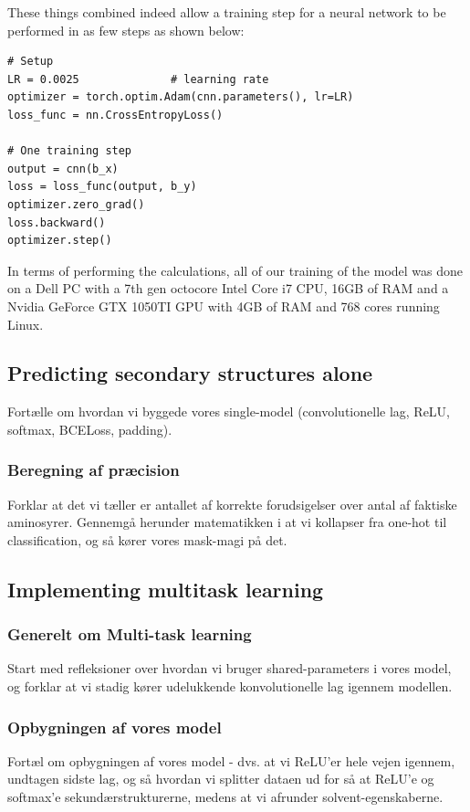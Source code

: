 These things combined indeed allow a training step for a neural network to be performed in as few steps as shown below:
\begin{lstlisting}
# Setup
LR = 0.0025              # learning rate
optimizer = torch.optim.Adam(cnn.parameters(), lr=LR)
loss_func = nn.CrossEntropyLoss()

# One training step
output = cnn(b_x)
loss = loss_func(output, b_y)
optimizer.zero_grad()
loss.backward()
optimizer.step()
\end{lstlisting}
In terms of performing the calculations, all of our training of the model was done on a Dell PC with a 7th gen octocore Intel Core i7 CPU, 16GB of RAM and a Nvidia GeForce GTX 1050TI GPU with 4GB of RAM and 768 cores running Linux.

\subsection{Predicting secondary structures alone}
Fortælle om hvordan vi byggede vores single-model (convolutionelle lag, ReLU, softmax, BCELoss, padding).

\subsubsection{Beregning af præcision}
Forklar at det vi tæller er antallet af korrekte forudsigelser over antal af faktiske aminosyrer. Gennemgå herunder matematikken i at vi kollapser fra one-hot til classification, og så kører vores mask-magi på det.

\subsection{Implementing multitask learning}
\subsubsection{Generelt om Multi-task learning}
Start med refleksioner over hvordan vi bruger shared-parameters i vores model, og forklar at vi stadig kører udelukkende konvolutionelle lag igennem modellen.
\subsubsection{Opbygningen af vores model}
Fortæl om opbygningen af vores model - dvs. at vi ReLU'er hele vejen igennem, undtagen sidste lag, og så hvordan vi splitter dataen ud for så at ReLU'e og softmax'e sekundærstrukturerne, medens at vi afrunder solvent-egenskaberne.


